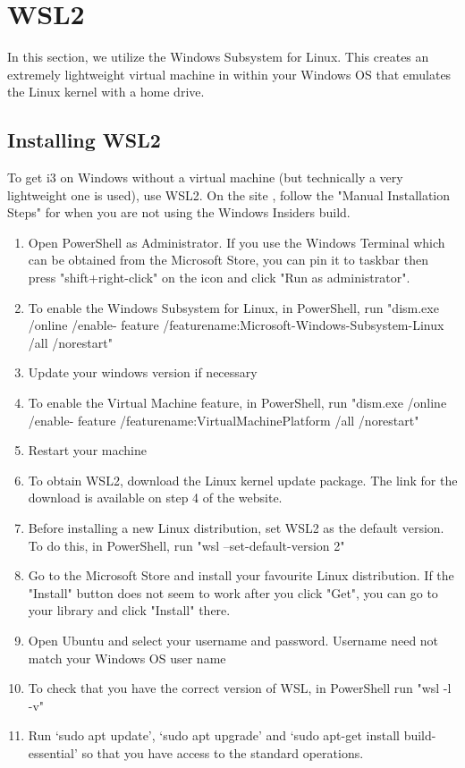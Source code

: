 \chapter{WSL2} \label{ChapWSL2}

In this section, we utilize the Windows Subsystem for Linux. This creates an
extremely lightweight virtual machine in within your Windows OS that emulates
the Linux kernel with a home drive.

\section{Installing WSL2}
To get i3 on Windows without a virtual machine (but technically a very
lightweight one is used), use WSL2. On the site \cite{microsoft2020wsl} , follow
the "Manual Installation Steps" for when you are not using the Windows Insiders
build.
\begin{enumerate}
    \item Open PowerShell as Administrator. If you use the Windows Terminal
        which can be obtained from the Microsoft Store, you can pin it to taskbar then
        press "shift+right-click" on the icon and click "Run as administrator".
    \item To enable the Windows Subsystem for Linux, in PowerShell, run "dism.exe /online /enable-
        feature /featurename:Microsoft-Windows-Subsystem-Linux /all /norestart"
    \item Update your windows version if necessary
    \item To enable the Virtual Machine feature, in PowerShell, run "dism.exe /online /enable-
        feature /featurename:VirtualMachinePlatform /all /norestart"
    \item Restart your machine
    \item To obtain WSL2, download the Linux kernel update package. The link for the download is
        available on step 4 of the website.
    \item Before installing a new Linux distribution, set WSL2 as the default version. To do this,
        in PowerShell, run "wsl --set-default-version 2"
    \item Go to the Microsoft Store and install your favourite Linux distribution. If the "Install"
        button does not seem to work after you click "Get", you can go to your library and click
        "Install" there.
    \item Open Ubuntu and select your username and password. Username need not match your Windows
        OS user name
    \item To check that you have the correct version of WSL, in PowerShell run "wsl -l -v"
    \item Run `sudo apt update', `sudo apt upgrade' and `sudo apt-get install
        build-essential' so that you have access to the standard operations.
\end{enumerate}
